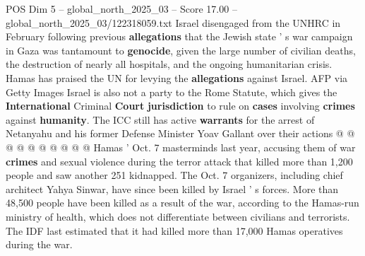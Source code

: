 \begin{textsample}{POS Dim 5 – global\_north\_2025\_03 – Score 17.00 – global\_north\_2025\_03/122318059.txt}
Israel disengaged from the UNHRC in February following previous \textbf{allegations} that the Jewish state ' s war campaign in Gaza was tantamount to \textbf{genocide}, given the large number of civilian deaths, the destruction of nearly all hospitals, and the ongoing humanitarian crisis.
Hamas has praised the UN for levying the \textbf{allegations} against Israel.
AFP via Getty Images Israel is also not a party to the Rome Statute, which gives the \textbf{International} Criminal \textbf{Court} \textbf{jurisdiction} to rule on \textbf{cases} involving \textbf{crimes} against \textbf{humanity}.
The ICC still has active \textbf{warrants} for the arrest of Netanyahu and his former Defense Minister Yoav Gallant over their actions @ @ @ @ @ @ @ @ @ @ Hamas ' Oct. 7 masterminds last year, accusing them of war \textbf{crimes} and sexual violence during the terror attack that killed more than 1,200 people and saw another 251 kidnapped.
The Oct. 7 organizers, including chief architect Yahya Sinwar, have since been killed by Israel ' s forces.
More than 48,500 people have been killed as a result of the war, according to the Hamas-run ministry of health, which does not differentiate between civilians and terrorists.
The IDF last estimated that it had killed more than 17,000 Hamas operatives during the war.

\end{textsample}
